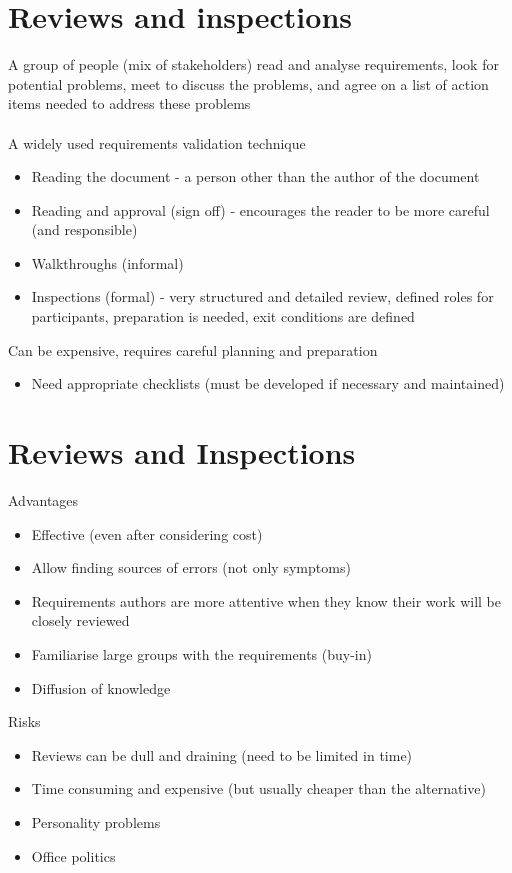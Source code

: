 \documentclass{article}[18pt]
\begin{document}
\section{Reviews and inspections}
A group of people (mix of stakeholders) read and analyse requirements, look for potential problems, meet to discuss the problems, and agree on a list of action items needed to address these problems\\
\\
A widely used requirements validation technique
\begin{itemize}
	\item Reading the document - a person other than the author of the document
	\item Reading and approval (sign off) - encourages the reader to be more careful (and responsible)
	\item Walkthroughs (informal)
	\item Inspections (formal) - very structured and detailed review, defined roles for participants, preparation is needed, exit conditions are defined
\end{itemize}
Can be expensive, requires careful planning and preparation
\begin{itemize}
	\item Need appropriate checklists (must be developed if necessary and maintained)
\end{itemize}
\section{Reviews and Inspections}
Advantages
\begin{itemize}
	\item Effective (even after considering cost)
	\item Allow finding sources of errors (not only symptoms)
	\item Requirements authors are more attentive when they know their work will be closely reviewed
	\item Familiarise large groups with the requirements (buy-in)
	\item Diffusion of knowledge
\end{itemize}
Risks
\begin{itemize}
	\item Reviews can be dull and draining (need to be limited in time)
	\item Time consuming and expensive (but usually cheaper than the alternative)
	\item Personality problems
	\item Office politics
\end{itemize}
\end{document}
